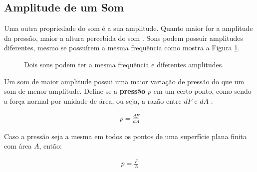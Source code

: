\documentclass[
    12pt,               %
    openright,          %
    oneside,
    a4paper,            
    english,            %
    brazil              %
    ]{abntex2}
\begin{document}
\subsection{Amplitude de um Som}

Uma outra propriedade do som é a sua amplitude. Quanto maior for a amplitude da pressão, maior a altura percebida do som \cite{halliday}. Sons podem possuir amplitudes diferentes, mesmo se possuírem a mesma frequência como mostra a Figura \ref{amplitude}.

\begin{figure}[!htb]
  \caption{\label{amplitude}Dois sons podem ter a mesma frequência e diferentes amplitudes.}
  \begin{center}
  \end{center}
\end{figure}

Um som de maior amplitude possui uma maior variação de pressão do que um som de menor amplitude. Define-se a \textbf{pressão} $p$ em um certo ponto, como sendo a força normal por unidade de área, ou seja, a razão entre $dF$ e $dA$ \cite{young}:

 \begin{align}
  p = \frac{dF}{dA} 
 \end{align}

Caso a pressão seja a mesma em todos os pontos de uma superfície plana finita com área $A$, então:

\begin{align}
  p = \frac{F}{A} 
\end{align}
\end{document}
